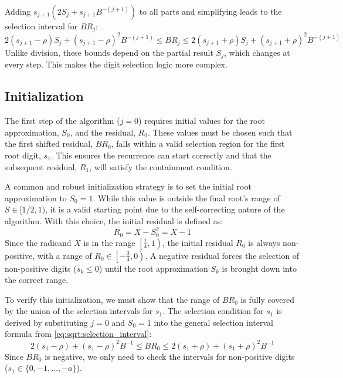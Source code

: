 \documentclass{article}
\begin{document}
Adding $s_{j+1} \left(2 S_j + s_{j+1} B^{-(j+1)}\right)$ to all parts and simplifying leads to the selection interval for $B R_j$:
\begin{equation}
  \label{eq:sqrt:selection_interval}
  2 (s_{j+1} - \rho) S_j + (s_{j+1} - \rho)^2 B^{-(j+1)} \leq B R_j \leq 2 (s_{j+1} + \rho) S_j + (s_{j+1} + \rho)^2 B^{-(j+1)}
\end{equation}
Unlike division, these bounds depend on the partial result $S_j$, which changes at every step.
This makes the digit selection logic more complex.

\subsection{Initialization}
\label{ssec:sqrt:init}
The first step of the algorithm ($j = 0$) requires initial values for the root approximation, $S_0$, and the residual, $R_0$.
These values must be chosen such that the first shifted residual, $B R_0$, falls within a valid selection region for the first root digit, $s_1$.
This ensures the recurrence can start correctly and that the subsequent residual, $R_1$, will satisfy the containment condition.

A common and robust initialization strategy is to set the initial root approximation to $S_0 = 1$.
While this value is outside the final root's range of $S \in [1/2, 1)$, it is a valid starting point due to the self-correcting nature of the algorithm.
With this choice, the initial residual is defined as:
\begin{equation}
  \label{eq:sqrt:init_r0}
  R_0 = X - S_0^2 = X - 1
\end{equation}
Since the radicand $X$ is in the range $\left[\frac{1}{4}, 1\right)$, the initial residual $R_0$ is always non-positive, with a range of $R_0 \in \left[-\frac{3}{4}, 0\right)$.
A negative residual forces the selection of non-positive digits ($s_k \leq 0$) until the root approximation $S_k$ is brought down into the correct range.

To verify this initialization, we must show that the range of $B R_0$ is fully covered by the union of the selection intervals for $s_1$.
The selection condition for $s_1$ is derived by substituting $j = 0$ and $S_0 = 1$ into the general selection interval formula from \cref{eq:sqrt:selection_interval}:
\begin{equation}
  \label{eq:sqrt:init_selection}
  2(s_1 - \rho) + (s_1 - \rho)^2 B^{-1} \leq B R_0 \leq 2(s_1 + \rho) + (s_1 + \rho)^2 B^{-1}
\end{equation}
Since $B R_0$ is negative, we only need to check the intervals for non-positive digits ($s_1 \in \{0, -1, \dots, -a\}$).
\end{document}
